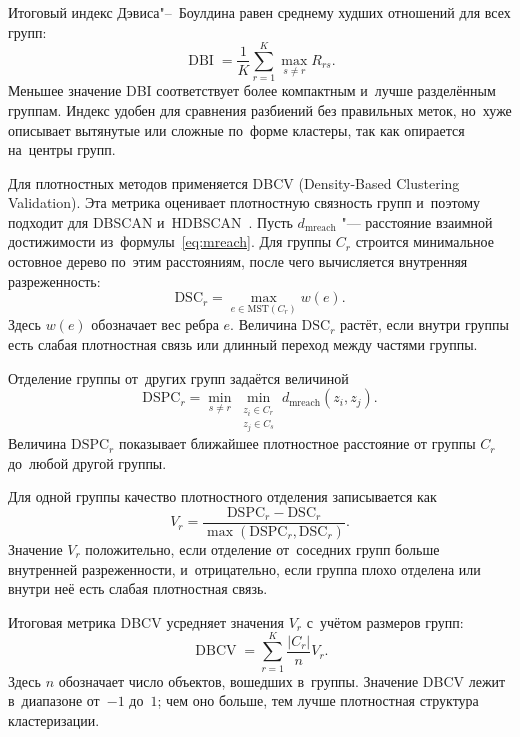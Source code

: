 Итоговый индекс Дэвиса"--~Боулдина равен среднему худших отношений для всех
групп:
\begin{equation}
    \label{eq:davies-bouldin}
    \operatorname{DBI} =
    \frac{1}{K}\sum_{r=1}^{K}\max_{s\ne r} R_{rs}.
\end{equation}
Меньшее значение DBI соответствует более компактным и~лучше разделённым
группам. Индекс удобен для сравнения разбиений без правильных меток, но~хуже
описывает вытянутые или сложные по~форме кластеры, так как опирается на~центры
групп.

Для плотностных методов применяется DBCV (Density-Based Clustering Validation).
Эта метрика оценивает плотностную связность групп и~поэтому подходит для DBSCAN
и~HDBSCAN~\autocite{Moulavi2014DBCV}. Пусть \( d_{\mathrm{mreach}} \) "---
расстояние взаимной достижимости из~формулы~\eqref{eq:mreach}. Для группы
\( C_r \) строится минимальное остовное дерево по~этим расстояниям, после чего
вычисляется внутренняя разреженность:
\begin{equation}
    \label{eq:dbcv-dsc}
    \mathrm{DSC}_r = \max_{e\in\mathrm{MST}(C_r)} w(e).
\end{equation}
Здесь \( w(e) \) обозначает вес ребра \( e \). Величина \( \mathrm{DSC}_r \)
растёт, если внутри группы есть слабая плотностная связь или длинный переход
между частями группы.

Отделение группы от~других групп задаётся величиной
\begin{equation}
    \label{eq:dbcv-dspc}
    \mathrm{DSPC}_r =
    \min_{s\ne r}\min_{\substack{z_i\in C_r\\ z_j\in C_s}}
    d_{\mathrm{mreach}}(z_i,z_j).
\end{equation}
Величина \( \mathrm{DSPC}_r \) показывает ближайшее плотностное расстояние от
группы \( C_r \) до~любой другой группы.

Для одной группы качество плотностного отделения записывается как
\begin{equation}
    \label{eq:dbcv-cluster-score}
    V_r =
    \frac{\mathrm{DSPC}_r-\mathrm{DSC}_r}
    {\max(\mathrm{DSPC}_r,\mathrm{DSC}_r)}.
\end{equation}
Значение \( V_r \) положительно, если отделение от~соседних групп больше
внутренней разреженности, и~отрицательно, если группа плохо отделена или внутри
неё есть слабая плотностная связь.

Итоговая метрика DBCV усредняет значения \( V_r \) с~учётом размеров групп:
\begin{equation}
    \label{eq:dbcv}
    \operatorname{DBCV} =
    \sum_{r=1}^{K}\frac{|C_r|}{n}V_r.
\end{equation}
Здесь \( n \) обозначает число объектов, вошедших в~группы. Значение DBCV лежит
в~диапазоне от~\(-1\) до~\(1\); чем оно больше, тем лучше плотностная структура
кластеризации.

